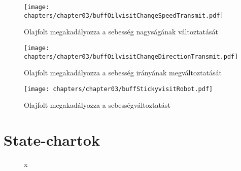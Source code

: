 \begin{figure}[h]
	\begin{center}
		\texttt{[image: chapters/chapter03/buffOilvisitChangeSpeedTransmit.pdf]}
		\caption{Olajfolt megakadályozza a sebesség nagyságának változtatását}
		\label{fig:buff.Oil.visit}
	\end{center}
\end{figure}

\begin{figure}[h]
	\begin{center}
		\texttt{[image: chapters/chapter03/buffOilvisitChangeDirectionTransmit.pdf]}
		\caption{Olajfolt megakadályozza a sebesség irányának megváltoztatását}
		\label{fig:buff.Oil.visit2}
	\end{center}
\end{figure}

\begin{figure}[h]
	\begin{center}
		\texttt{[image: chapters/chapter03/buffStickyvisitRobot.pdf]}
		\caption{Olajfolt megakadályozza a sebességváltoztatást}
		\label{fig:buff.Sticky.visit}
	\end{center}
\end{figure}

\section{State-chartok}

\begin{figure}[h]
\begin{center}
\caption{x}
\label{fig:example3}
\end{center}
\end{figure}

